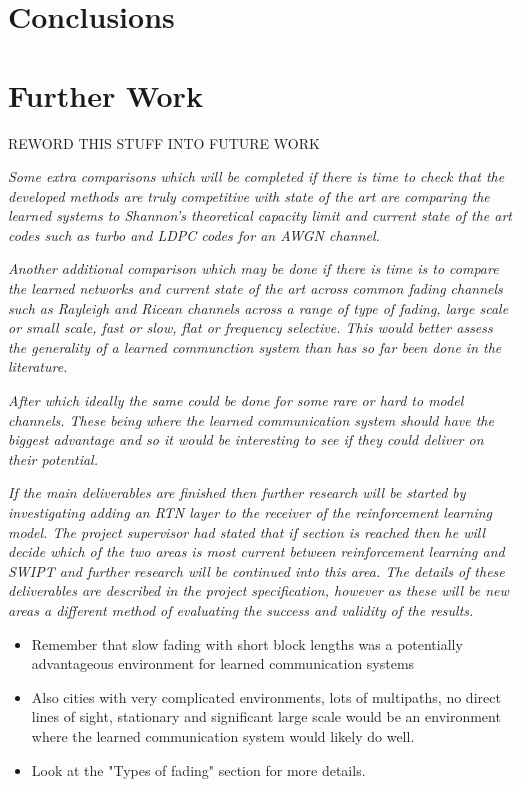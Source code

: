 \documentclass[12pt,onecolumn,letterpaper]{article}
\begin{document}
\FloatBarrier
\section{Conclusions}


\FloatBarrier
\section{Further Work}

REWORD THIS STUFF INTO FUTURE WORK

\textit{
Some extra comparisons which will be completed if there is time to check that the developed methods are truly competitive with state of the art are comparing the learned systems to Shannon's theoretical capacity limit and current state of the art codes such as turbo and LDPC codes for an AWGN channel.
}

\textit{
Another additional comparison which may be done if there is time is to compare the learned networks and current state of the art across common fading channels such as Rayleigh and Ricean channels across a range of type of fading, large scale or small scale, fast or slow, flat or frequency selective. This would better assess the generality of a learned communction system than has so far been done in the literature.
}

\textit{
After which ideally the same could be done for some rare or hard to model channels. These being where the learned communication system should have the biggest advantage and so it would be interesting to see if they could deliver on their potential.
}

\textit{
If the main deliverables are finished then further research will be started by investigating adding an RTN layer to the receiver of the reinforcement learning model. The project supervisor had stated that
if section is reached then he will decide which of the two areas is most current between reinforcement learning and SWIPT and further research will be continued into this area. The details of these deliverables are described in the project specification, however as these will be new areas a different method of evaluating the success and validity of the results.
}

\begin{itemize}
   \item Remember that slow fading with short block lengths was a potentially advantageous environment for learned communication systems
   \item Also cities with very complicated environments, lots of multipaths, no direct lines of sight, stationary and significant large scale would be an environment where the learned communication system would likely do well.
   \item Look at the "Types of fading" section for more details.
\end{itemize}
\end{document}
